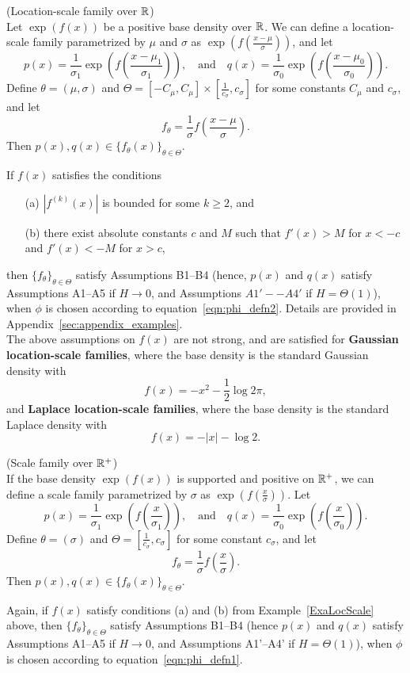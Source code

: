 \documentclass{article}
\begin{document}
\begin{example}
\label{ExaLocScale}
(Location-scale family over ${\mathbb R}$)\\
Let $\exp(f(x))$ be a positive base density over ${\mathbb R}$. We can define a location-scale family parametrized by $\mu$ and $\sigma$ as 
$\exp( f(\frac{x - \mu}{\sigma}) )$, and let
$$p(x) = \frac{1}{\sigma_1} \exp\left( f\left( \frac{x - \mu_1}{\sigma_1}  \right) \right), \quad \textrm{and} \quad 
q(x) = \frac{1}{\sigma_0} \exp\left( f \left( \frac{x - \mu_0}{\sigma_0}  \right) \right).$$ 
Define $\theta = (\mu, \sigma)$ and $\Theta = [- C_{\mu}, C_{\mu}] \times \left[\frac{1}{c_{\sigma}}, c_{\sigma}\right]$ for some constants $C_{\mu}$ and $c_{\sigma}$, and let 
\[
f_{\theta} = \frac{1}{\sigma} f\left( \frac{ x - \mu}{\sigma} \right).
\]
Then $p(x), q(x) \in \{ f_{\theta}(x) \}_{\theta \in \Theta}$.

If $f(x)$ satisfies the conditions
\begin{itemize}
\item[(a)] $|f^{(k)}(x)|$ is bounded for some $k \geq 2$, and
\item[(b)] there exist absolute constants $c$ and $M$ such that $f'(x) > M$ for $x < -c$ and $f'(x) < -M$ for $x > c$,
\end{itemize}
then $\{f_{\theta} \}_{\theta \in \Theta}$ satisfy Assumptions B1--B4 (hence, $p(x)$ and $q(x)$ satisfy Assumptions A1--A5 if $H \rightarrow 0$, and Assumptions $A1'--A4'$ if $H = \Theta(1)$), when $\phi$ is chosen according to equation~\eqref{eqn:phi_defn2}. Details are provided in Appendix~\ref{sec:appendix_examples}. \\

The above assumptions on $f(x)$ are not strong, and are satisfied for \textbf{Gaussian location-scale families}, where the base density is the standard Gaussian density with
\[
f(x) = -x^2 - \frac{1}{2} \log 2 \pi,
\]
and \textbf{Laplace location-scale families}, where the base density is the standard Laplace density with
\[
f(x) = - |x| - \log 2.
\]
\end{example}

\begin{example} (Scale family over ${\mathbb R}^+$)\\
If the base density $\exp(f(x))$ is supported and positive on ${\mathbb R}^+$, we can define a scale family parametrized by $\sigma$ as 
$\exp( f(\frac{x}{\sigma}) )$. 
Let 
$$p(x) = \frac{1}{\sigma_1} \exp\left( f\left( \frac{x}{\sigma_1}  \right) \right), \quad \textrm{and} \quad 
q(x) = \frac{1}{\sigma_0} \exp\left( f \left( \frac{x}{\sigma_0}  \right) \right).$$ 
Define $\theta = (\sigma)$ and $\Theta = \left[\frac{1}{c_{\sigma}}, c_{\sigma}\right]$ for some constant $c_{\sigma}$, and let 
\[
f_{\theta} = \frac{1}{\sigma} f\left( \frac{x}{\sigma} \right).
\]
Then $p(x), q(x) \in \{ f_{\theta}(x) \}_{\theta \in \Theta}$.

Again, if $f(x)$ satisfy conditions (a) and (b) from Example~\ref{ExaLocScale} above,
then $\{f_{\theta} \}_{\theta \in \Theta}$ satisfy Assumptions B1--B4 (hence $p(x)$ and $q(x)$ satisfy Assumptions A1--A5 if $H \rightarrow 0$, and Assumptions A1'--A4' if $H = \Theta(1)$), when $\phi$ is chosen according to equation~\eqref{eqn:phi_defn1}. 
\end{example}
\end{document}
